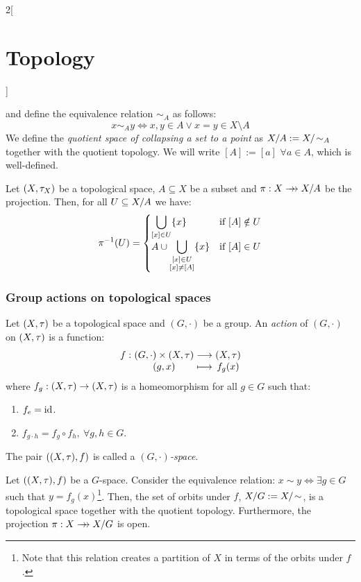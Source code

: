 \documentclass[../../../main_math.tex]{subfiles}
\begin{document}
\begin{multicols}{2}[\section{Topology}]
\begin{definition}
    and define the equivalence relation $\sim_A$ as follows: $$x\sim_A y\iff x,y\in A\lor x=y\in X\setminus A$$
    We define the \emph{quotient space of collapsing a set to a point} as $\quot{X}{A}:=\quot{X}{\!\sim_A}$ together with the quotient topology. We will write $[A]:=[a]$ $\forall a\in A$, which is well-defined.
  \end{definition}
  \begin{proposition}
    Let $(X,\tau_X)$ be a topological space, $A\subseteq X$ be a subset and $\pi:X\rrightarrow\quot{X}{A}$ be the projection. Then, for all $U\subseteq\quot{X}{A}$ we have:
    $$
      \pi^{-1}(U)=\begin{cases}
        \displaystyle\bigcup_{[x]\in U}\{x\} & \text{if }[A]\notin U \\
        \displaystyle A\cup \bigcup_{
          \begin{subarray}{c}
            [x]\in U \\
            [x]\ne [A]
          \end{subarray}
        }\{x\}                               & \text{if }[A]\in U
      \end{cases}
    $$
  \end{proposition}
  \subsubsection{Group actions on topological spaces}
  \begin{definition}
    Let $(X,\tau)$ be a topological space and $(G,\cdot)$ be a group. An \emph{action} of $(G,\cdot)$ on $(X,\tau)$ is a function:
    $$\function{f}{(G,\cdot)\times(X,\topo)}{(X,\topo)}{(g,x)}{f_g(x)}$$ where $f_g:(X,\tau)\rightarrow(X,\tau)$ is a homeomorphism for all $g\in G$ such that:
    \begin{enumerate}
      \item $f_e=\mathrm{id}$.
      \item $f_{g\cdot h}=f_g\circ f_h,\ \forall g,h\in G$.
    \end{enumerate}
    The pair $((X,\tau),f)$ is called a \emph{$(G,\cdot)$-space}.
  \end{definition}
  \begin{proposition}
    Let $((X,\tau),f)$ be a $G$-space. Consider the equivalence relation: $x\sim y\iff\exists g\in G$ such that $y=f_g(x)$\footnote{Note that this relation creates a partition of $X$ in terms of the orbits under $f$.}. Then, the set of orbits under $f$, $\quot{X}{G}:=\quot{X}{\!\sim}$, is a topological space together with the quotient topology. Furthermore, the projection $\pi:X\rrightarrow\quot{X}{G}$ is open.
  \end{proposition}

\end{multicols}
\end{document}
